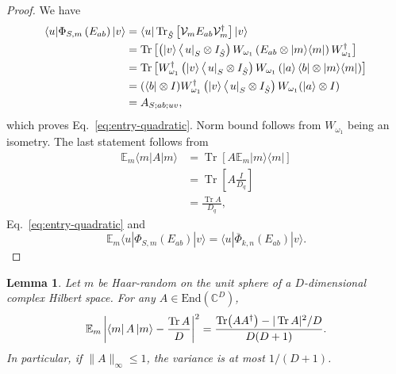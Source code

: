 \documentclass[11pt,letterpaper]{article}
\theoremstyle{plain}
\theoremstyle{plain}
\theoremstyle{plain}
\theoremstyle{plain}
\theoremstyle{plain}
\theoremstyle{plain}
\newcommand{\C}{\mathbb{C}}
\newcommand{\End}{\mathrm{End}}
\theoremstyle{plain}
\newtheorem{smlemma}[smtheorem]{Lemma}
\theoremstyle{definition}
\theoremstyle{plain}
\begin{document}
\begin{proof}
We have
\begin{align*}
\langle u| \Phi_{S, m}\left(E_{a b}\right)|v\rangle&=\langle u|\operatorname{Tr}_{\hat S}\left[\mathcal{V}_m E_{a b} \mathcal{V}_m^{\dagger}\right]|v\rangle\\
&=\operatorname{Tr}\left[\left(|v\rangle\left\langle\left. u\right|_S \otimes I_{\hat S}\right) W_{\omega_1}\left(E_{a b} \otimes|m\rangle\langle m|\right) W_{\omega_1}^{\dagger}\right]\right.\\
&=\operatorname{Tr}\left[W_{\omega_1}^{\dagger}\left(|v\rangle\left\langle\left. u\right|_S \otimes I_{\hat S}\right) W_{\omega_1}\left(\ket{a}\bra{b} \otimes|m\rangle\langle m|\right)\right]\right.\\
&=(\langle b| \otimes I) W_{\omega_1}^{\dagger}\left(|v\rangle\left\langle\left. u\right|_S \otimes I_{\hat S}\right) W_{\omega_1}(|a\rangle \otimes I)\right.\\
&=A_{S ; a b ; u v},
\end{align*}
which proves Eq.~\eqref{eq:entry-quadratic}. Norm bound follows from $W_{\omega_1}$ being an isometry. The last statement follows from
\[
    \begin{aligned}
\mathbb{E}_m\langle m| A|m\rangle & =\operatorname{Tr}\left[A \mathbb{E}_m|m\rangle\langle m|\right] \\
& =\operatorname{Tr}\left[A \frac{I}{D_q}\right] \\
& =\frac{\operatorname{Tr} A}{D_q},
\end{aligned}
\]
Eq.~\eqref{eq:entry-quadratic} and 
\[
\mathbb{E}_m\langle u| \Phi_{S, m}\left(E_{a b}\right)|v\rangle=\langle u| \overline{\Phi}_{k,n}\left(E_{a b}\right)|v\rangle.
\]
\end{proof}

\begin{smlemma}
\label{lem:haar-second-moment}
Let $m$ be Haar-random on the unit sphere of a $D$-dimensional complex Hilbert space. For any $A\in\End(\C^D)$,
\begin{equation}
\label{eq:haar-variance}
  \mathbb{E}_m\left|
  \bra mA\ket m-\frac{\Tr A}{D}
  \right|^2
  =\frac{\Tr(AA^\dagger)-|\Tr A|^2/D}{D(D+1)}.
\end{equation}
In particular, if $\|A\|_\infty\le1$, the variance is at most $1/(D+1)$.
\end{smlemma}
\end{document}

